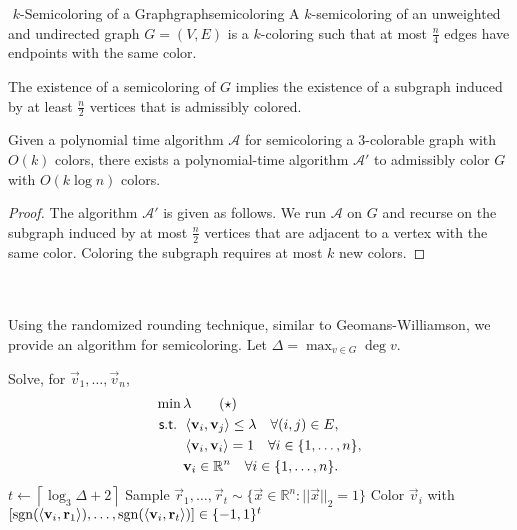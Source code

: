         \begin{definition}{\Stop\,\,\(k\)-Semicoloring of a Graph}{graphsemicoloring}
            A \(k\)-semicoloring of an unweighted and undirected graph \(G=(V,E)\) is a \(k\)-coloring such that at most \(\frac{n}{4}\) edges have endpoints with the same color.
        \end{definition}
        \begin{remark*}
            The existence of a semicoloring of \(G\) implies the existence of a subgraph induced by at least \(\frac{n}{2}\) vertices that is admissibly colored.
        \end{remark*}
        \begin{lemma*}
            Given a polynomial time algorithm \(\mathcal{A}\) for semicoloring a \(3\)-colorable graph with \(O(k)\) colors, there exists a polynomial-time algorithm \(\mathcal{A}'\) to admissibly color \(G\) with \(O(k\log n)\) colors.
            \begin{proof}
                The algorithm \(\mathcal{A}'\) is given as follows. We run \(\mathcal{A}\) on \(G\) and recurse on the subgraph induced by at most \(\frac{n}{2}\) vertices that are adjacent to a vertex with the same color. Coloring the subgraph requires at most \(k\) new colors.
            \end{proof}
        \end{lemma*}
        \vphantom
        \\
        \\
        Using the randomized rounding technique, similar to Geomans-Williamson, we provide an algorithm for semicoloring. Let \(\Delta=\max_{v\in G}\deg v\).
        \begin{algorithm}[H] 
            \begin{algorithmic}[1]
                    \State Solve, for \(\vec{v}_1,\ldots,\vec{v}_n\),
                    \begin{align*}
                        \min\,&\lambda \tag{\(\star\)}\\
                        \textsf{s.t. }&\left\langle \mathbf{v}_i,\mathbf{v}_j\right\rangle\leq\lambda\quad \forall (i,j)\in E, \\
                        &\left\langle \mathbf{v}_i,\mathbf{v}_i\right\rangle=1 \quad \forall i\in\{1,\ldots,n\}, \\
                        &\mathbf{v}_i\in\mathbb{R}^n \quad \forall i\in\{1,\ldots,n\}.
                    \end{align*}
                    \State \(t\gets \left\lceil \log_3\Delta+2\right\rceil\)
                    \State Sample \(\vec{r}_1,\ldots,\vec{r}_t\sim\{\vec{x}\in\mathbb{R}^n:||\vec{x}||_2=1\}\)
                        \State Color \(\vec{v}_i\) with \([\operatorname{sgn}(\left\langle \mathbf{v}_i,\mathbf{r}_1\right\rangle),\ldots,\operatorname{sgn}(\left\langle \mathbf{v}_i,\mathbf{r}_t\right\rangle)]\in\{-1,1\}^t\) 
                    \EndFor
                \EndProcedure 
            \end{algorithmic}
            \caption{Graph Semicoloring}
            \label{alg:graph-semicoloring}
        \end{algorithm}
